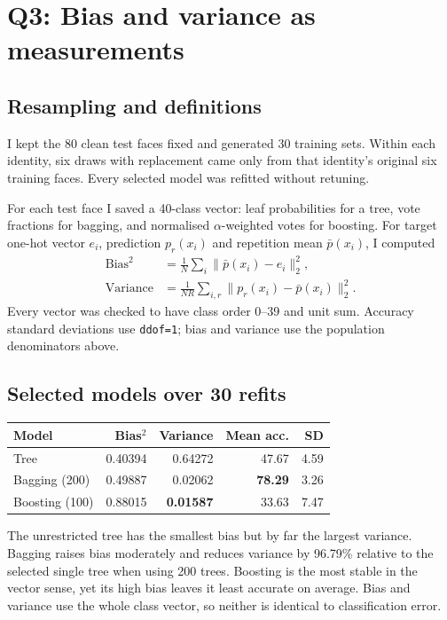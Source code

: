 \documentclass[10pt,twocolumn,letterpaper]{article}
\begin{document}
\clearpage
\section{Q3: Bias and variance as measurements}
\subsection{Resampling and definitions}
I kept the 80 clean test faces fixed and generated 30 training sets. Within each identity, six draws with replacement came only from that identity's original six training faces. Every selected model was refitted without retuning.

For each test face I saved a 40-class vector: leaf probabilities for a tree, vote fractions for bagging, and normalised $\alpha$-weighted votes for boosting. For target one-hot vector $e_i$, prediction $p_r(x_i)$ and repetition mean $\bar p(x_i)$, I computed
\begin{align}
\mathrm{Bias}^2 &= \frac{1}{N}\sum_i \|\bar p(x_i)-e_i\|_2^2,\\
\mathrm{Variance} &= \frac{1}{NR}\sum_{i,r}\|p_r(x_i)-\bar p(x_i)\|_2^2.
\end{align}
Every vector was checked to have class order 0--39 and unit sum. Accuracy standard deviations use \texttt{ddof=1}; bias and variance use the population denominators above.

\subsection{Selected models over 30 refits}
\begin{table}[h]
\centering\scriptsize
\begin{tabular}{lrrrr}
\toprule
Model & Bias$^2$ & Variance & Mean acc. & SD \\
\midrule
Tree & 0.40394 & 0.64272 & 47.67 & 4.59 \\
Bagging (200) & 0.49887 & 0.02062 & \textbf{78.29} & 3.26 \\
Boosting (100) & 0.88015 & \textbf{0.01587} & 33.63 & 7.47 \\
\bottomrule
\end{tabular}
\end{table}

The unrestricted tree has the smallest bias but by far the largest variance. Bagging raises bias moderately and reduces variance by 96.79\% relative to the selected single tree when using 200 trees. Boosting is the most stable in the vector sense, yet its high bias leaves it least accurate on average. Bias and variance use the whole class vector, so neither is identical to classification error.
\end{document}
